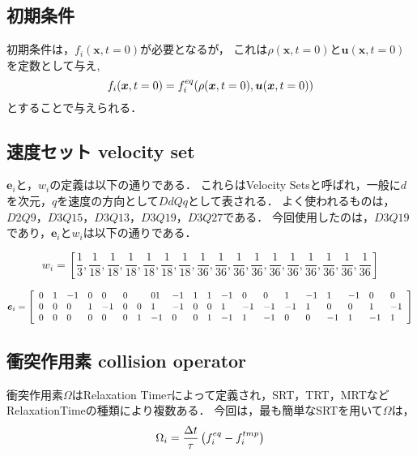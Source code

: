 \subsection{初期条件}
初期条件は，$f_i(\bm{x}, t=0)$が必要となるが，
これは$\rho(\bm{x}, t=0)$と$\bm{u}(\bm{x}, t=0)$を定数として与え,
\begin{equation}\label{eq:initial-ddf}
    f_i(\bm{x}, t=0) = f^{eq}_{i}(\rho(\bm{x}, t=0), \bm{u}(\bm{x}, t=0))
\end{equation}
とすることで与えられる．

\subsection{速度セット velocity set}\label{sec:lbm-velocity-set}
$\bm{e}_i$と，$w_i$の定義は以下の通りである．
これらはVelocity Setsと呼ばれ，一般に$d$を次元，$q$を速度の方向として$DdQq$として表される．
よく使われるものは，$D2Q9$，$D3Q15$，$D3Q13$，$D3Q19$，$D3Q27$である．
今回使用したのは，$D3Q19$であり，$\bm{e}_i$と$w_i$は以下の通りである．

\begin{landscape}
    \centering
    \begin{equation}
        w_i = \left[
            \frac{1}{3}, \frac{1}{18}, \frac{1}{18}, \frac{1}{18}, \frac{1}{18}, \frac{1}{18}, \frac{1}{18}, \frac{1}{36}, \frac{1}{36}, \frac{1}{36}, \frac{1}{36}, \frac{1}{36}, \frac{1}{36}, \frac{1}{36}, \frac{1}{36}, \frac{1}{36}, \frac{1}{36}
            \right]
    \end{equation}

    \begin{equation}
        \bm{e}_i =
        \left[
            \begin{array}[]{llllllllllllllllllll}
                0 & 1 & -1 & 0 & 0  & 0 &   & 0 1 & -1 & 1 & 1 & -1 & 0  & 0  & 1  & -1 & 1  & -1 & 0  & 0  \\
                0 & 0 & 0  & 1 & -1 & 0 & 0 & 1   & -1 & 0 & 0 & 1  & -1 & -1 & -1 & 1  & 0  & 0  & 1  & -1 \\
                0 & 0 & 0  & 0 & 0  & 0 & 1 & -1  & 0  & 0 & 1 & -1 & 1  & -1 & 0  & 0  & -1 & 1  & -1 & 1
            \end{array}
            \right]
    \end{equation}
\end{landscape}

\subsection{衝突作用素 collision operator}
衝突作用素$\Omega$はRelaxation Time$\tau$によって定義され，SRT，TRT，MRTなどRelaxationTimeの種類により複数ある．
今回は，最も簡単なSRTを用いて$\Omega$は，
\begin{equation}
    \Omega_i = \frac{\Delta t}{\tau} \left( f^{eq}_{i} - f^{tmp}_{i} \right)
\end{equation}

